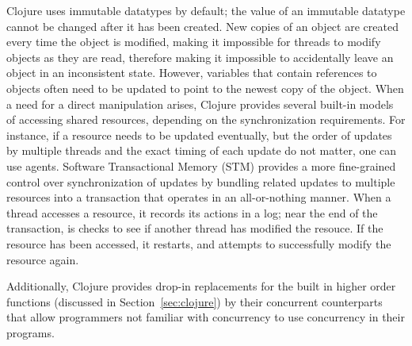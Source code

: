 \documentclass[12pt]{article}
\newcommand{\comment}[1]{{\bf \tt  {#1}}}
\newcommand{\emcomment}[1]{\textcolor{ForestGreen}{\comment{Elena: {#1}}}}
\newcommand{\hfcomment}[1]{\textcolor{Teal}{\comment{Henry: {#1}}}}
\begin{document}
Clojure uses immutable datatypes by default; the value of an immutable datatype cannot be changed after it has been created. New copies of an object are created every time the object is modified, making it impossible for threads to modify objects as they are read, therefore making it impossible to accidentally leave an object in an inconsistent state. 
However, variables that contain references to objects often need to be updated to point to the newest copy of the object. When a need for a direct manipulation arises, 
Clojure provides several built-in models of accessing shared resources, depending on the synchronization requirements. For instance, if a resource needs to be updated eventually, but the order of updates by multiple threads and the exact timing of each update do not matter, one can use agents. Software Transactional Memory (STM) provides a more fine-grained control over synchronization of updates by bundling related updates to multiple resources into a transaction that operates in an all-or-nothing manner. When a thread accesses a resource, it records its actions in a log; near the end of the transaction, is checks to see if another thread has modified the resouce. If the resource has been accessed, it restarts, and attempts to successfully modify the resource again.

Additionally, Clojure provides drop-in replacements for the built in higher order functions (discussed in Section~\ref{sec:clojure}) by their concurrent counterparts that allow programmers not familiar with concurrency to use concurrency in their programs.
\end{document}
